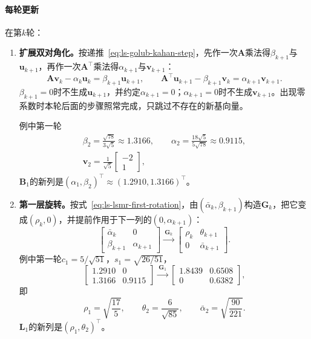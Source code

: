 \paragraph{每轮更新}
在第$k$轮：
\begin{enumerate}
 \item \textbf{扩展双对角化。}按递推~\eqref{eq:ls-golub-kahan-step}，先作一次$\bm A$乘法得$\beta_{k+1}$与$\bm u_{k+1}$，再作一次$\bm A^\top$乘法得$\alpha_{k+1}$与$\bm v_{k+1}$：
 \[
  \bm A\bm v_k-\alpha_k\bm u_k=\beta_{k+1}\bm u_{k+1},\qquad
  \bm A^\top\bm u_{k+1}-\beta_{k+1}\bm v_k=\alpha_{k+1}\bm v_{k+1} .
 \]
 $\beta_{k+1}=0$时不生成$\bm u_{k+1}$，并约定$\alpha_{k+1}=0$；$\alpha_{k+1}=0$时不生成$\bm v_{k+1}$。出现零系数时本轮后面的步骤照常完成，只跳过不存在的新基向量。

 例中第一轮
 \[
  \begin{gathered}
  \beta_2=\frac{\sqrt{78}}{3\sqrt5}\approx1.3166,\qquad
  \alpha_2=\frac{18\sqrt5}{5\sqrt{78}}\approx0.9115,\\
  \bm v_2=\frac1{\sqrt5}\begin{bmatrix}-2\\1\end{bmatrix},
  \end{gathered}
 \]
 $\bm B_1$的新列是$(\alpha_1,\beta_2)^\top\approx(1.2910,1.3166)^\top$。

 \item \textbf{第一层旋转。}按式~\eqref{eq:ls-lsmr-first-rotation}，由$(\bar\alpha_k,\beta_{k+1})$构造$\bm G_k$，把它变成$(\rho_k,0)$，并提前作用于下一列的$(0,\alpha_{k+1})$：
 \[
  \begin{bmatrix}\bar\alpha_k&0\\\beta_{k+1}&\alpha_{k+1}\end{bmatrix}
  \xrightarrow{\ \bm G_k\ }
  \begin{bmatrix}\rho_k&\theta_{k+1}\\0&\bar\alpha_{k+1}\end{bmatrix}.
 \]
 例中第一轮$c_1=5/\sqrt{51}$，$s_1=\sqrt{26/51}$，
 \[
  \begin{bmatrix}1.2910&0\\1.3166&0.9115\end{bmatrix}
  \xrightarrow{\ \bm G_1\ }
  \begin{bmatrix}1.8439&0.6508\\0&0.6382\end{bmatrix},
 \]
 即
 \[
  \rho_1=\sqrt{\frac{17}5},\qquad \theta_2=\frac6{\sqrt{85}},\qquad \bar\alpha_2=\sqrt{\frac{90}{221}} .
 \]
 $\bm L_1$的新列是$(\rho_1,\theta_2)^\top$。


\end{enumerate}
